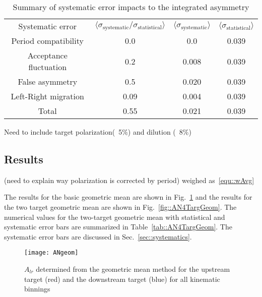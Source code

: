 \begin{table}[h!t]
  \centering
  \begin{tabular}{|c|c|c|c|}
    \hline
    \multirow{2}{*}{Systematic error}&
    \multirow{2}{*}{
      $\langle \sigma_{\mathrm{systematic}}/\sigma_{\mathrm{statistical}}
      \rangle$} &
    \multirow{2}{*}{$\langle \sigma_{\mathrm{systematic}} \rangle$} &
    \multirow{2}{*}{$\langle \sigma_{\mathrm{statistical}} \rangle$} \\
    
    & & & \\ \hline

    Period compatibility& 0.0 & 0.0 & 0.039\\ \hline

    Acceptance fluctuation& 0.2 & 0.008 & 0.039\\ \hline

    False asymmetry& 0.5 & 0.020 & 0.039\\ \hline

    Left-Right migration& 0.09 & 0.004 & 0.039\\ \hline

    Total& 0.55 & 0.021 & 0.039\\\hline
    
  \end{tabular}
  \caption{Summary of systematic error impacts to the integrated asymmetry}
  \label{tab::sysError}
\end{table}
Need to include target polarization(~5\%) and dilution (~8\%)

\subsection{Results} \label{sec::lr_results}
(need to explain way polarization is corrected by period)
weighed as~\ref{equ::wAvg}

\noindent
The results for the basic geometric mean are shown in Fig.~\ref{fig::ANgeom} and
the results for the two target geometric mean are shown in
Fig.~\ref{fig::AN4TargGeom}.  The numerical values for the two-target geometric
mean with statistical and systematic error bars are summarized in
Table~\ref{tab::AN4TargGeom}.  The systematic error bars are discussed in
Sec.~\ref{sec::systematics}.

\begin{figure}[h!t]
  \begin{center}
    \texttt{[image: ANgeom]} 
    \caption{$A_{lr}$ determined from the geometric mean method for the
      upstream target (red) and the downstream target (blue) for all kinematic
      binnings}
    \label{fig::ANgeom}
  \end{center}
\end{figure}

